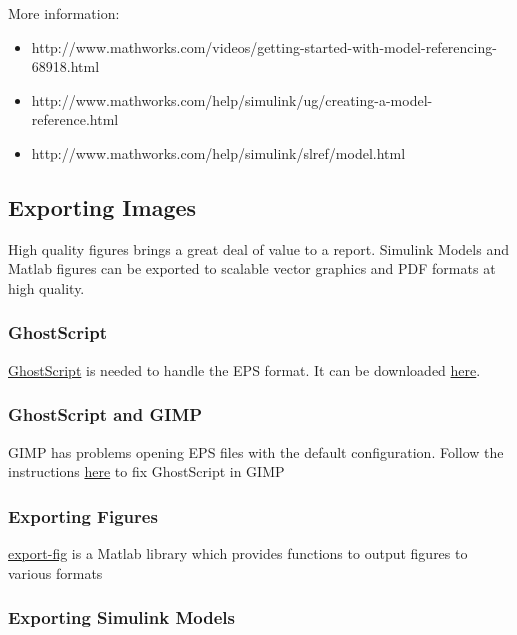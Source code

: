 \documentclass[]{article}
\providecommand{\tightlist}{%
  \setlength{\itemsep}{0pt}\setlength{\parskip}{0pt}}
\begin{document}
More information:

\begin{itemize}
\tightlist
\item
  http://www.mathworks.com/videos/getting-started-with-model-referencing-68918.html
\item
  http://www.mathworks.com/help/simulink/ug/creating-a-model-reference.html
\item
  http://www.mathworks.com/help/simulink/slref/model.html
\end{itemize}

\subsection{Exporting Images}\label{exporting-images}

High quality figures brings a great deal of value to a report. Simulink
Models and Matlab figures can be exported to scalable vector graphics
and PDF formats at high quality.

\subsubsection{GhostScript}\label{ghostscript}

\href{http://www.ghostscript.com/}{GhostScript} is needed to handle the
EPS format. It can be downloaded
\href{http://www.ghostscript.com/download/}{here}.

\subsubsection{GhostScript and GIMP}\label{ghostscript-and-gimp}

GIMP has problems opening EPS files with the default configuration.
Follow the instructions
\href{http://blog.tjitjing.com/index.php/2013/05/solution-error-open-eps-in-gimp-64-bit-with-ghostscript.html}{here}
to fix GhostScript in GIMP

\subsubsection{Exporting Figures}\label{exporting-figures}

\href{http://www.mathworks.com/matlabcentral/fileexchange/23629-export-fig}{export-fig}
is a Matlab library which provides functions to output figures to
various formats

\subsubsection{Exporting Simulink
Models}\label{exporting-simulink-models}
\end{document}
